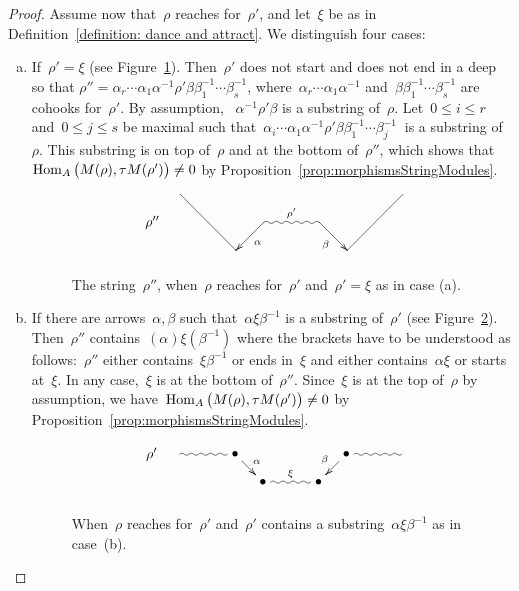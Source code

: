 \documentclass{memo-l}
\theoremstyle{definition}
\newcommand{\Hom}[1]{\operatorname{{\rm Hom}}_{#1}}
\begin{document}
\begin{proof}
Assume now that~$\rho$ reaches for~$\rho'$, and let~$\xi$ be as in Definition~\ref{definition: dance and attract}.
We distinguish four cases:

\begin{enumerate}[(a)]
\item If~$\rho'=\xi$ (see Figure~\ref{fig:dance case a}). Then~$\rho'$ does not start and does not end in a deep so that ${\rho''= \alpha_r\cdots\alpha_1\alpha^{-1}\rho'\beta\beta_1^{-1}\cdots\beta_s^{-1}}$, where~$\alpha_r\cdots\alpha_1\alpha^{-1}$ and~$\beta\beta_1^{-1}\cdots\beta_s^{-1}$ are cohooks for~$\rho'$.
 By assumption, ~$\alpha^{-1}\rho'\beta$ is a substring of~$\rho$. Let~$0\leq i\leq r$ and~$0\leq j\leq s$ be maximal such that~$\alpha_i\cdots\alpha_1\alpha^{-1}\rho'\beta\beta_1^{-1}\cdots\beta_j^{-1}~$ is a substring of~$\rho$.
 This substring is on top of~$\rho$ and at the bottom of~$\rho''$, which shows that~$\Hom{A} \big( M(\rho), \tau M(\rho') \big) \ne 0$ by Proposition~\ref{prop:morphismsStringModules}.

\begin{figure}[h]
 	\capstart
\[
\xy
%
(7,14)="lpeak";
(63,14)="rpeak";
%
(0,7)*+{\rho''}="10";
(28,7)="14";
(42,7)="16";
%
(21,0)="3";
(49,0)="7";
%
{\ar@{~}^{\rho'} "14";"16"};
%
{\ar^{\alpha} "14";"3"};
{\ar@{-} "lpeak";"3"};
%
{\ar_{\beta} "16";"7"};
{\ar@{-} "rpeak";"7"};
%
\endxy
\]
    \caption{The string~$\rho''$, when~$\rho$ reaches for~$\rho'$ and~$\rho'=\xi$ as in case (a).}
    \vspace{-.5cm}
    \label{fig:dance case a}
\end{figure}

\item If there are arrows~$\alpha, \beta$ such that~$\alpha\xi\beta^{-1}$ is a substring of~$\rho'$ (see Figure~\ref{fig:dance case b}).
 Then~$\rho''$ contains~$(\alpha)\xi(\beta^{-1})$ where the brackets have to be understood as follows:~$\rho''$ either contains~$\xi\beta^{-1}$ or ends in~$\xi$ and either contains~$\alpha\xi$ or starts at~$\xi$.
 In any case,~$\xi$ is at the bottom of~$\rho''$. Since~$\xi$ is at the top of~$\rho$ by assumption, we have~$\Hom{A} \big( M(\rho), \tau M(\rho') \big)\neq 0$ by Proposition~\ref{prop:morphismsStringModules}.

\begin{figure}[h]
 	\capstart
\[
\xy
%
(-35,14)*+{\rho'};
(-28,14)="-14";
(-14,14)*+{\bullet}="-12";
(-7,7)*+{\bullet}="-11";
(7,7)*+{\bullet}="11";
(14,14)*+{\bullet}="12";
(28,14)="14";
%
{\ar@{~} "-14";"-12"};
{\ar^{\alpha} "-12";"-11"};
{\ar@{~}^{\xi} "-11";"11"};
{\ar_{\beta} "12";"11"};
{\ar@{~} "12";"14"};
%
\endxy
\]
    \caption{When~$\rho$ reaches for~$\rho'$ and~$\rho'$ contains a substring~$\alpha\xi\beta^{-1}$ as in case~(b).}
    \vspace{-.5cm}
    \label{fig:dance case b}
\end{figure}


\end{enumerate}
\end{proof}
\end{document}
